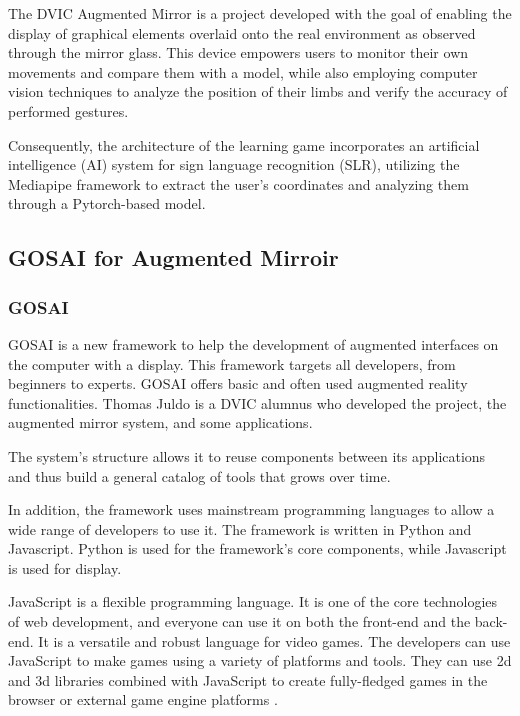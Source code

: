 The DVIC Augmented Mirror is a project developed with the goal of enabling the display of graphical elements overlaid onto the real environment as observed through the mirror glass. This device empowers users to monitor their own movements and compare them with a model, while also employing computer vision techniques to analyze the position of their limbs and verify the accuracy of performed gestures.

Consequently, the architecture of the learning game incorporates an artificial intelligence (AI) system for sign language recognition (SLR), utilizing the Mediapipe framework to extract the user's coordinates and analyzing them through a Pytorch-based model.

\subsection{GOSAI for Augmented Mirroir}

\subsubsection{GOSAI}

GOSAI \cite{gosai} is a new framework to help the development of augmented interfaces on the computer with a display. This framework targets all developers, from beginners to experts. GOSAI offers
basic and often used augmented reality functionalities. Thomas Juldo is a DVIC alumnus who developed the project, the augmented mirror system, and some applications. 

The system's structure allows it to reuse components between its applications and thus build a general catalog of tools that grows over time.

In addition, the framework uses mainstream programming languages to allow a wide range of developers to
use it. The framework is written in Python and Javascript.
Python is used for the framework's core components,
while Javascript is used for display.

JavaScript is a flexible programming language. It is one of the core
technologies of web development, and everyone can use it on both the
front-end and the back-end.
It is a versatile and robust language for video games. The developers can use JavaScript to make games using a variety of platforms and tools. They can use 2d and 3d libraries combined with JavaScript to create fully-fledged games in the browser or external game engine platforms \cite{javascriptgaming}.

